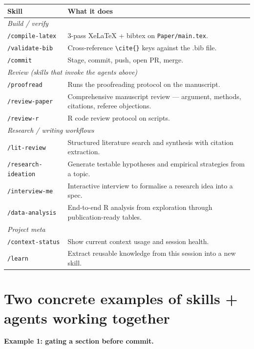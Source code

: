 \documentclass[10pt]{article}
\begin{document}
\begin{tabular}{l p{}}
\toprule
Skill & What it does\\
\midrule
\multicolumn{2}{l}{\textit{Build / verify}}\\
\quad \texttt{/compile-latex}     & 3-pass XeLaTeX + bibtex on \texttt{Paper/main.tex}.\\
\quad \texttt{/validate-bib}      & Cross-reference \texttt{\textbackslash cite\{\}} keys against the .bib file.\\
\quad \texttt{/commit}            & Stage, commit, push, open PR, merge.\\
\multicolumn{2}{l}{\textit{Review (skills that invoke the agents above)}}\\
\quad \texttt{/proofread}         & Runs the proofreading protocol on the manuscript.\\
\quad \texttt{/review-paper}      & Comprehensive manuscript review --- argument, methods, citations, referee objections.\\
\quad \texttt{/review-r}          & R code review protocol on scripts.\\
\multicolumn{2}{l}{\textit{Research / writing workflows}}\\
\quad \texttt{/lit-review}        & Structured literature search and synthesis with citation extraction.\\
\quad \texttt{/research-ideation} & Generate testable hypotheses and empirical strategies from a topic.\\
\quad \texttt{/interview-me}      & Interactive interview to formalise a research idea into a spec.\\
\quad \texttt{/data-analysis}     & End-to-end R analysis from exploration through publication-ready tables.\\
\multicolumn{2}{l}{\textit{Project meta}}\\
\quad \texttt{/context-status}    & Show current context usage and session health.\\
\quad \texttt{/learn}             & Extract reusable knowledge from this session into a new skill.\\
\bottomrule
\end{tabular}

\section*{Two concrete examples of skills + agents working together}

\textbf{Example 1: gating a section before commit.}
\end{document}
